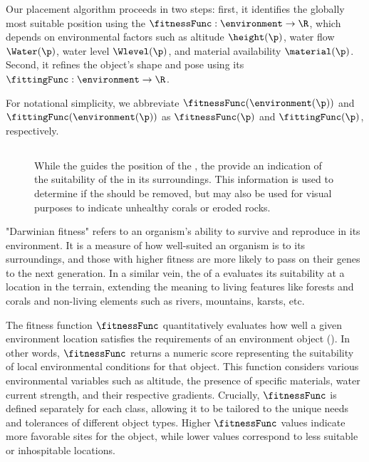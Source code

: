 Our placement algorithm proceeds in two steps: first, it identifies the globally most suitable position using the  $\fitnessFunc: \environment \to \R$, which depends on environmental factors such as altitude $\height(\p)$, water flow $\Water(\p)$, water level $\Wlevel(\p)$, and material availability $\material(\p)$. Second, it refines the object's shape and pose using its  $\fittingFunc: \environment \to \R$.

For notational simplicity, we abbreviate $\fitnessFunc(\environment(\p))$ and $\fittingFunc(\environment(\p))$ as $\fitnessFunc(\p)$ and $\fittingFunc(\p)$, respectively.

\subsection{ }

\begin{figure}
    \caption{While the  guides the position of the , the  provide an indication of the suitability of the  in its surroundings. This information is used to determine if the  should be removed, but may also be used for visual purposes to indicate unhealthy corals or eroded rocks. }
    \label{fig:env-obj_procedural-erosion}
\end{figure}


"Darwinian fitness" refers to an organism's ability to survive and reproduce in its environment. It is a measure of how well-suited an organism is to its surroundings, and those with higher fitness are more likely to pass on their genes to the next generation. In a similar vein, the  of a  evaluates its suitability at a location in the terrain, extending the meaning to living features like forests and corals and non-living elements such as rivers, mountains, karsts, etc.

The fitness function $\fitnessFunc$ quantitatively evaluates how well a given environment location satisfies the requirements of an environment object (). In other words, $\fitnessFunc$ returns a numeric score representing the suitability of local environmental conditions for that object. This function considers various environmental variables such as altitude, the presence of specific materials, water current strength, and their respective gradients. Crucially, $\fitnessFunc$ is defined separately for each  class, allowing it to be tailored to the unique needs and tolerances of different object types. Higher $\fitnessFunc$ values indicate more favorable sites for the object, while lower values correspond to less suitable or inhospitable locations. 


